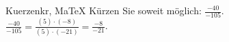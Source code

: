 \begin{MAufgabe}{Kuerzen}{kr, MaTeX}
K\"urzen Sie soweit m\"oglich: $\frac{-40}{-105}$.\\ 
\ifLsg\MLoesung
\quad $\frac{-40}{-105}=\frac{(5)\cdot(-8)}{(5)\cdot(-21)}=\frac{-8}{-21}$.\else\relax\fi
 \end{MAufgabe}